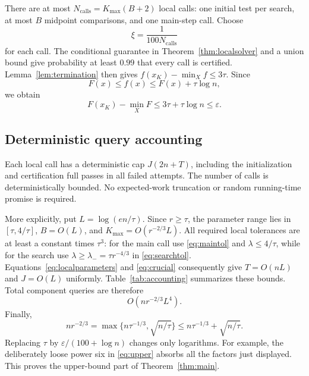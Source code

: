 \documentclass[11pt,a4paper]{article}
\theoremstyle{definition}\newtheorem{definition}[theorem]{Definition}
\theoremstyle{remark}\newtheorem{remark}[theorem]{Remark}
\newcommand{\eps}{\varepsilon}
\begin{document}
There are at most $N_{\mathrm{calls}}=K_{\max}(B+2)$ local calls: one initial test per search, at most $B$ midpoint comparisons, and one main-step call. Choose
\[
 \xi=\frac1{100N_{\mathrm{calls}}}
\]
for each call. The conditional guarantee in Theorem~\ref{thm:localsolver} and a union bound give probability at least $0.99$ that every call is certified. Lemma~\ref{lem:termination} then gives $f(x_K)-\min_Xf\le3\tau$. Since
\[
 F(x)\le f(x)\le F(x)+\tau\log n,
\]
we obtain
\[
 F(x_K)-\min_XF\le3\tau+\tau\log n\le\eps.
\]

\subsection{Deterministic query accounting}
Each local call has a deterministic cap $J(2n+T)$, including the initialization and certification full passes in all failed attempts. The number of calls is deterministically bounded. No expected-work truncation or random running-time promise is required.

More explicitly, put $L=\log(en/\tau)$. Since $r\ge\tau$, the parameter range lies in
$[\tau,4/\tau]$, $B=O(L)$, and $K_{\max}=O(r^{-2/3}L)$. All required local tolerances are at least a constant times $\tau^3$: for the main call use \eqref{eq:maintol} and $\lambda\le4/\tau$, while for the search use $\lambda\ge\lambda_-=\tau r^{-4/3}$ in \eqref{eq:searchtol}. Equations~\eqref{eq:localparameters} and \eqref{eq:crucial} consequently give $T=O(nL)$ and $J=O(L)$ uniformly. Table~\ref{tab:accounting} summarizes these bounds. Total component
queries are therefore
\begin{equation}\label{eq:totalwork}
 O(nr^{-2/3}L^4).
\end{equation}
Finally,
\begin{equation}\label{eq:radiusidentity}
 nr^{-2/3}
 =\max\{n\tau^{-1/3},\sqrt{n/\tau}\}
 \le n\tau^{-1/3}+\sqrt{n/\tau}.
\end{equation}
Replacing $\tau$ by $\eps/(100+\log n)$ changes only logarithms. For example, the deliberately loose power six in \eqref{eq:upper} absorbs all the factors just displayed. This proves the upper-bound part of Theorem~\ref{thm:main}.
\end{document}
